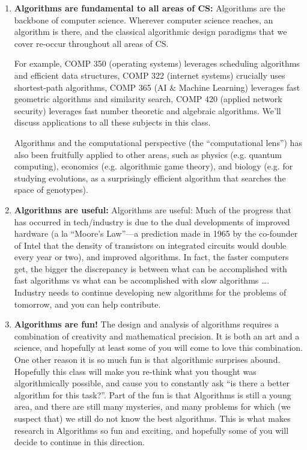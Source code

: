 \documentclass [12pt]{article}
\begin{document}
\begin{enumerate}
    \item \textbf{Algorithms are fundamental to all areas of CS:} Algorithms are the backbone of computer science. Wherever computer science reaches, an algorithm is there, and the classical algorithmic design paradigms that we cover re-occur throughout all areas of CS.
    
    For example, COMP 350 (operating systems) leverages scheduling algorithms and efficient data structures, COMP 322 (internet systems) crucially uses shortest-path algorithms, COMP 365 (AI \& Machine Learning) leverages fast geometric algorithms and similarity search, COMP 420 (applied network security) leverages fast number theoretic and algebraic algorithms. We’ll discuss applications to all these subjects in this class.
    
    Algorithms and the computational perspective (the “computational lens”) has also been fruitfully applied to other areas, such as physics (e.g. quantum computing), economics (e.g. algorithmic game theory), and biology (e.g. for studying evolutions, as a surprisingly efficient algorithm that searches the space of genotypes).
    
    \item \textbf{Algorithms are useful:} Algorithms are useful: Much of the progress that has occurred in tech/industry is due to the dual developments of improved hardware (a la ``Moore’s Law''—a prediction made in 1965 by the co-founder of Intel that the density of transistors on integrated circuits would double every year or two), and improved algorithms. In fact, the faster computers get, the bigger the discrepancy is between what can be accomplished with fast algorithms vs what can be accomplished with slow algorithms \dots. Industry needs to continue developing new algorithms for the problems of tomorrow, and you can help contribute.
    
    \item \textbf{Algorithms are fun!} The design and analysis of algorithms requires a combination of creativity and mathematical precision. It is both an art and a science, and hopefully at least some of you will come to love this combination. One other reason it is so much fun is that algorithmic surprises abound. Hopefully this class will make you re-think what you thought was algorithmically possible, and cause you to constantly ask “is there a better algorithm for this task?”. Part of the fun is that Algorithms is still a young area, and there are still many mysteries, and many problems for which (we suspect that) we still do not know the best algorithms. This is what makes research in Algorithms so fun and exciting, and hopefully some of you will decide to continue in this direction.
    

\end{enumerate}
\end{document}
